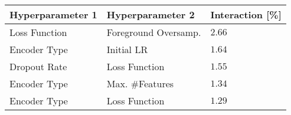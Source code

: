 \begin{tabular}{lll}
\toprule
Hyperparameter 1 & Hyperparameter 2 & Interaction [\%] \\
\midrule
Loss Function & Foreground Oversamp. & $2.66$ \\
Encoder Type & Initial LR & $1.64$ \\
Dropout Rate & Loss Function & $1.55$ \\
Encoder Type & Max. #Features & $1.34$ \\
Encoder Type & Loss Function & $1.29$ \\
\bottomrule
\end{tabular}
